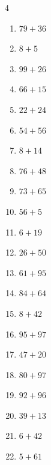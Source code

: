 \begin{multicols}{4}
\begin{enumerate}
  \item $79+36$
        \phantom{$=115$}

  \item $8+5$
        \phantom{$=13$}

  \item $99+26$
        \phantom{$=125$}

  \item $66+15$
        \phantom{$=81$}

  \item $22+24$
        \phantom{$=46$}

  \item $54+56$
        \phantom{$=110$}

  \item $8+14$
        \phantom{$=22$}

  \item $76+48$
        \phantom{$=124$}

  \item $73+65$
        \phantom{$=138$}

  \item $56+5$
        \phantom{$=61$}

  \item $6+19$
        \phantom{$=25$}

  \item $26+50$
        \phantom{$=76$}

  \item $61+95$
        \phantom{$=156$}

  \item $84+64$
        \phantom{$=148$}

  \item $8+42$
        \phantom{$=50$}

  \item $95+97$
        \phantom{$=192$}

  \item $47+20$
        \phantom{$=67$}

  \item $80+97$
        \phantom{$=177$}

  \item $92+96$
        \phantom{$=188$}

  \item $39+13$
        \phantom{$=52$}

  \item $6+42$
        \phantom{$=48$}

  \item $5+61$
        \phantom{$=66$}


\end{enumerate}
\end{multicols}
